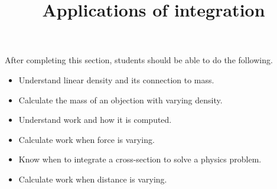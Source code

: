 \documentclass{ximera}
\title{Applications of integration}
\begin{document}
\begin{abstract}
\end{abstract}

\maketitle

\begin{sectionOutcomes}

After completing this section, students should be able to do the following.

\begin{itemize}
\item Understand linear density and its connection to mass.
\item Calculate the mass of an objection with varying density.
\item Understand work and how it is computed.
\item Calculate work when force is varying.
\item Know when to integrate a cross-section to solve a physics problem.
\item Calculate work when distance is varying.
\end{itemize}

\end{sectionOutcomes}
\end{document}
